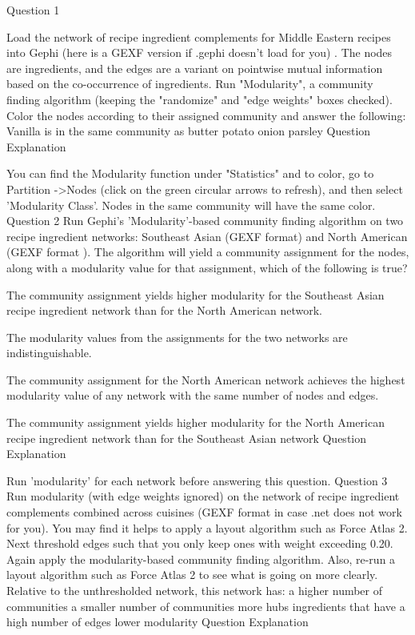 Question 1

Load the network of recipe ingredient complements for Middle Eastern recipes into Gephi (here is a GEXF version if .gephi doesn't load for you) . The nodes are ingredients, and the edges are a variant on pointwise mutual information based on the co-occurrence of ingredients. Run "Modularity", a community finding algorithm (keeping the "randomize" and "edge weights" boxes checked). Color the nodes according to their assigned community and answer the following: 
Vanilla is in the same community as
butter
potato
onion
parsley
Question Explanation

You can find the Modularity function under "Statistics" and to color, go to Partition ->Nodes (click on the green circular arrows to refresh), and then select 'Modularity Class'. Nodes in the same community will have the same color.
Question 2
Run Gephi's 'Modularity'-based community finding algorithm on two recipe ingredient networks: Southeast Asian (GEXF format) and North American (GEXF format ). The algorithm will yield a community assignment for the nodes, along with a modularity value for that assignment, which of the following is true?
\item The community assignment yields higher modularity for the Southeast Asian recipe ingredient network than for the North American network.
\item The modularity values from the assignments for the two networks are indistinguishable.
\item The community assignment for the North American network achieves the highest modularity value of any network with the same number of nodes and edges.
\item The community assignment yields higher modularity for the North American recipe ingredient network than for the Southeast Asian network
Question Explanation

Run 'modularity' for each network before answering this question.
Question 3
Run modularity (with edge weights ignored) on the network of recipe ingredient complements combined across cuisines (GEXF format in case .net does not work for you). You may find it helps to apply a layout algorithm such as Force Atlas 2. Next threshold edges such that you only keep ones with weight exceeding 0.20. Again apply the modularity-based community finding algorithm. Also, re-run a layout algorithm such as Force Atlas 2 to see what is going on more clearly. Relative to the unthresholded network, this network has:
a higher number of communities
a smaller number of communities
more hubs ingredients that have a high number of edges
lower modularity
Question Explanation

